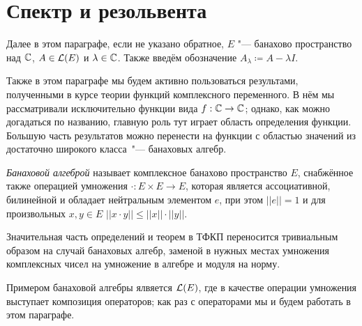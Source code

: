 \documentclass[main]{subfiles}
\begin{document}
\section{Спектр и резольвента} %
%

Далее в этом параграфе,
если не указано обратное,
\( E \) "--- банахово пространство над \( \mathbb{C} \),
\( A \in \Linears{E} \) и \( \lambda \in \mathbb{C} \).
Также введём обозначение \( A_\lambda \coloneqq A - \lambda I \).

Также в этом параграфе мы будем активно
пользоваться результами,
полученными в курсе
теории функций комплексного переменного.
В нём мы рассматривали
исключительно функции
вида \( f : \mathbb{C} \to \mathbb{C} \);
однако, как можно догадаться по названию,
главную роль тут играет область определения функции.
Большую часть результатов можно перенести
на функции с областью значений из достаточно
широкого класса~"--- банаховых алгебр.

\begin{definition}
  \emph{Банаховой алгеброй}
  называет комплексное банахово пространство \( E \),
  снабжённое также операцией умножения
  \( \cdot : E \times E \to E \),
  которая является 
  ассоциативной, билинейной и
  обладает нейтральным элементом \( e \),
  при этом \( ||e|| = 1 \)
  и для произвольных \( x, y \in E \)
  \( ||x \cdot y|| \le ||x|| \cdot ||y|| \).
\end{definition}

Значительная часть определений и теорем в ТФКП
переносится тривиальным образом на случай
банаховых алгебр, заменой в нужных местах
умножения комплексных чисел на умножение в алгебре
и модуля на норму.

Примером банаховой алгебры ялвяется
\( \Linears{E} \), где в качестве операции
умножения выступает композиция операторов;
как раз с операторами мы и будем работать в этом параграфе.

%
\end{document}
